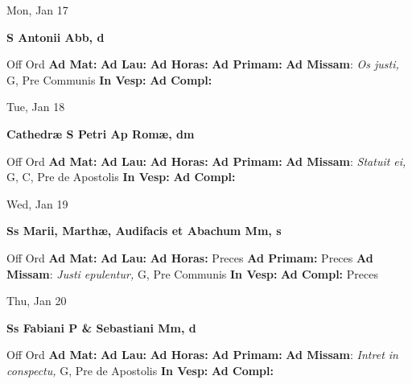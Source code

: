 \documentclass[10pt]{article}
\begin{document}
\begin{minipage}{3.5in}
\vspace{2em}\begin{center}
Mon, Jan 17
\end{center}\textbf{ \large S Antonii Abb, \textnormal{\normalsize d}}
\begin{justify}
Off Ord
\textbf{Ad Mat: }
\textbf{Ad Lau: }
\textbf{Ad Horas: }
\textbf{Ad Primam: }
\textbf{Ad Missam}: \textit{Os justi,} G, Pre Communis
\textbf{In Vesp: }
\textbf{Ad Compl: }\end{justify}
\end{minipage}



\begin{minipage}{3.5in}
\vspace{2em}\begin{center}
Tue, Jan 18
\end{center}\textbf{ \large Cathedræ S Petri Ap Romæ, \textnormal{\normalsize dm}}
\begin{justify}
Off Ord
\textbf{Ad Mat: }
\textbf{Ad Lau: }
\textbf{Ad Horas: }
\textbf{Ad Primam: }
\textbf{Ad Missam}: \textit{Statuit ei,} G, C, Pre de Apostolis
\textbf{In Vesp: }
\textbf{Ad Compl: }\end{justify}
\end{minipage}



\begin{minipage}{3.5in}
\vspace{2em}\begin{center}
Wed, Jan 19
\end{center}\textbf{ \large Ss Marii, Marthæ, Audifacis et Abachum Mm, \textnormal{\normalsize s}}
\begin{justify}
Off Ord
\textbf{Ad Mat: }
\textbf{Ad Lau: }
\textbf{Ad Horas: }Preces
\textbf{Ad Primam: }Preces
\textbf{Ad Missam}: \textit{Justi epulentur,} G, Pre Communis
\textbf{In Vesp: }
\textbf{Ad Compl: }Preces\end{justify}
\end{minipage}



\begin{minipage}{3.5in}
\vspace{2em}\begin{center}
Thu, Jan 20
\end{center}\textbf{ \large Ss Fabiani P \& Sebastiani Mm, \textnormal{\normalsize d}}
\begin{justify}
Off Ord
\textbf{Ad Mat: }
\textbf{Ad Lau: }
\textbf{Ad Horas: }
\textbf{Ad Primam: }
\textbf{Ad Missam}: \textit{Intret in conspectu,} G, Pre de Apostolis
\textbf{In Vesp: }
\textbf{Ad Compl: }\end{justify}
\end{minipage}
\end{document}
